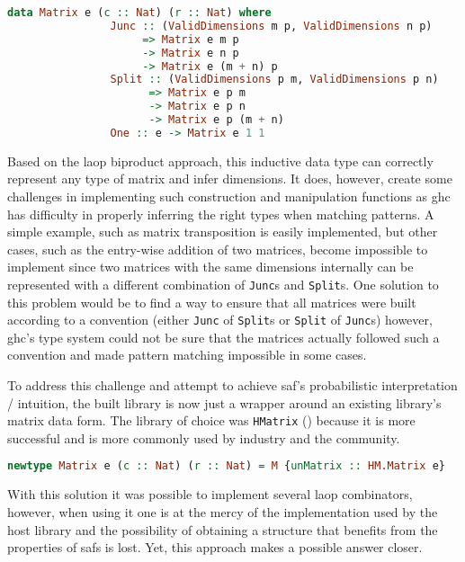 \documentclass[
  oneside,
  11pt, a4paper,
  footinclude=true,
  headinclude=true,
  cleardoublepage=empty
]{scrbook}
\theoremstyle{definition}
\theoremstyle{definition}
\begin{document}
        \begin{lstlisting}[language=Haskell, caption={Inductive matrix definition},captionpos=b]
            data Matrix e (c :: Nat) (r :: Nat) where
                Junc :: (ValidDimensions m p, ValidDimensions n p) 
                     => Matrix e m p 
                     -> Matrix e n p 
                     -> Matrix e (m + n) p
                Split :: (ValidDimensions p m, ValidDimensions p n) 
                      => Matrix e p m 
                      -> Matrix e p n 
                      -> Matrix e p (m + n)
                One :: e -> Matrix e 1 1
        \end{lstlisting}{}
        
        Based on the \gls{laop} biproduct approach, this inductive data type can correctly represent any type of matrix and infer dimensions. It does, however, create some challenges in implementing such construction and manipulation functions as \gls{ghc} has difficulty in properly inferring the right types when matching patterns. A simple example, such as matrix transposition is easily implemented, but other cases, such as the entry-wise addition of two matrices, become impossible to implement since two matrices with the same dimensions internally can be represented with a different combination of \texttt{Junc}s and \texttt{Split}s. One solution to this problem would be to find a way to ensure that all matrices were built according to a convention (either \texttt{Junc} of \texttt{Split}s or \texttt {Split} of \texttt{Junc}s) however, \gls{ghc}'s type system could not be sure that the matrices actually followed such a convention and made pattern matching impossible in some cases.
	    
	    To address this challenge and attempt to achieve \gls{saf}'s probabilistic interpretation / intuition, the built library is now just a wrapper around an existing library's matrix data form. The library of choice was \texttt{HMatrix} (\cite{hmatrix}) because it is more successful and is more commonly used by industry and the community.
	    
        \begin{lstlisting}[language=Haskell, label={lst:m-type-2}, caption={Type safe wrapper around HMatrix},captionpos=b]
        newtype Matrix e (c :: Nat) (r :: Nat) = M {unMatrix :: HM.Matrix e}
        \end{lstlisting}{}
        
        With this solution it was possible to implement several \gls{laop} combinators, however, when using it one is at the mercy of the implementation used by the host library and the possibility of obtaining a structure that benefits from the properties of \glspl{saf} is lost. Yet, this approach makes a possible answer closer. 
        
\end{document}
